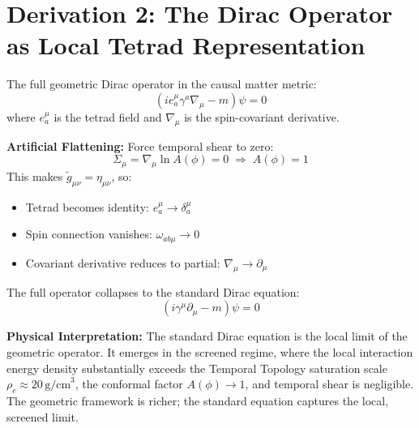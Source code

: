 \documentclass{article}
\begin{document}
\section*{Derivation 2: The Dirac Operator as Local Tetrad Representation}

The full geometric Dirac operator in the causal matter metric:
\[
\left( i e^\mu_a \gamma^a \nabla_\mu - m \right) \psi = 0
\]
where $e^\mu_a$ is the tetrad field and $\nabla_\mu$ is the spin-covariant derivative.

\textbf{Artificial Flattening:} Force temporal shear to zero:
\[
\Sigma_\mu = \nabla_\mu \ln A(\phi) = 0 \;\Rightarrow\; A(\phi) = 1
\]
This makes $\tilde{g}_{\mu\nu} = \eta_{\mu\nu}$, so:
\begin{itemize}
\item Tetrad becomes identity: $e^\mu_a \to \delta^\mu_a$
\item Spin connection vanishes: $\omega_{ab\mu} \to 0$
\item Covariant derivative reduces to partial: $\nabla_\mu \to \partial_\mu$
\end{itemize}

The full operator collapses to the standard Dirac equation:
\[
(i \gamma^\mu \partial_\mu - m) \psi = 0
\]

\textbf{Physical Interpretation:} The standard Dirac equation is the local limit of the geometric operator. It emerges in the screened regime, where the local interaction energy density substantially exceeds the Temporal Topology saturation scale $\rho_c \approx 20\,\mathrm{g/cm}^3$, the conformal factor $A(\phi) \to 1$, and temporal shear is negligible. The geometric framework is richer; the standard equation captures the local, screened limit.
\end{document}
